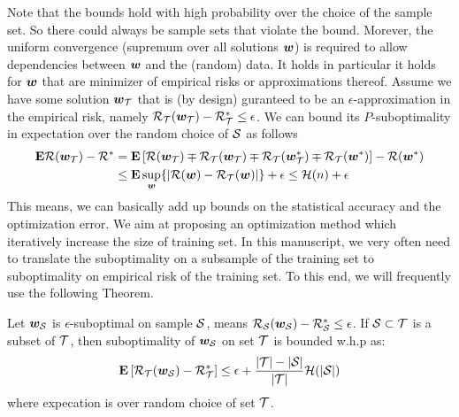 \documentclass{article}
\begin{document}
Note that the bounds hold with high probability over the choice of the sample set. So there could always be sample sets that violate the bound. Morever, the uniform convergence (supremum over all solutions $\w$) is required to allow dependencies between $\w$  and the (random) data. It holds in particular it holds for $\w$ that are minimizer of empirical risks or approximations thereof. 
Assume we have some solution $\w_\T$ that is (by design) guranteed to be an
$\epsilon$-approximation in the empirical risk, namely $\risk_\T(\w_\T) - \risk_\T^* \le \epsilon$.
 We can bound its $P$-suboptimality in expectation over the random choice of $\S$ as follows 
\begin{align}
\label{eq:exprisk-bound}
\E \risk(\w_\T) - \risk^*  & = 
\E \left[ \risk(\w_\T) \mp \risk_{\T}(\w_{\T}) \mp \risk_{\T}(\w_{\T}^*) \mp
\risk_\T(\w^*) \right]   - \risk(\w^*)
\\ & \le \E \sup_{\w} \{ | \risk(\w) -  \risk_\T(\w) | \} + \epsilon  \le 
\bound(n) + \epsilon
\nonumber
\end{align}
This means, we can basically add up bounds on the statistical accuracy and the
optimization error. 
We aim at proposing an optimization method which iteratively increase the size
of training set. In this manuscript, we very often need to translate the
suboptimality on a subsample of the training set to suboptimality on empirical
risk of the training set. To this end, we will frequently use the following
Theorem.
 \begin{theorem} \label{theorem:generalization_bound_on_subset}
 		Let $\w_\S$ is $\epsilon$-suboptimal on sample $\S$, means 
 		$\risk_\S(\w_\S) - \risk_\S^* \le \epsilon$. 
 		If $\S \subset \T$ is a subset of $\T$, then suboptimality of $\w_\S$ on set
 		$\T$ is bounded w.h.p as: 
 		\begin{align}
			\E \left[ \risk_\T(\w_\S) - \risk_\T^*\right] \le \epsilon +
			\frac{|\T|-|\S|}{|\T|} \bound(|\S|)
			\label{eq:new-epsilon} 
		\end{align}
		where expecation is over random choice of set $\T$. 
 \end{theorem}
\end{document}

